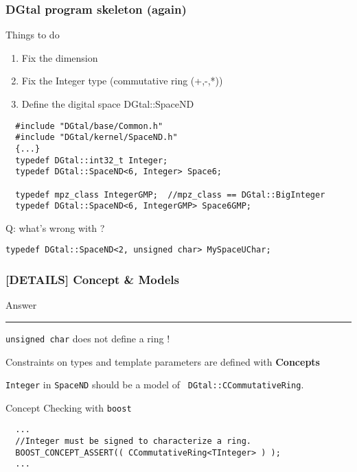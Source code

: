 \documentclass[8pt]{beamer}
\newcommand{\HH}{ \vspace{0.5pt}\hrule}
\begin{document}
\begin{frame}[containsverbatim]
  \frametitle{DGtal program skeleton (again)}

Things to do
  \begin{enumerate}
  \item Fix the dimension
  \item Fix the Integer type (commutative ring (+,-,*))
  \item Define the digital space DGtal::SpaceND
  \end{enumerate}


  
\begin{lstlisting}
  #include "DGtal/base/Common.h"
  #include "DGtal/kernel/SpaceND.h"
  {...}
  typedef DGtal::int32_t Integer;
  typedef DGtal::SpaceND<6, Integer> Space6;
  
  typedef mpz_class IntegerGMP;  //mpz_class == DGtal::BigInteger
  typedef DGtal::SpaceND<6, IntegerGMP> Space6GMP;
\end{lstlisting}

Q: what's wrong with ?
\begin{lstlisting}
typedef DGtal::SpaceND<2, unsigned char> MySpaceUChar;
\end{lstlisting}
\end{frame}


\begin{frame}[containsverbatim]
  \frametitle{[DETAILS] Concept \& Models}
  
  
  \begin{alertblock}{Answer\HH}
    \texttt{unsigned char} does not define a ring !
  \end{alertblock}

\vspace{0.5cm}

\begin{block}{}
  Constraints on types and template parameters are defined with {\bf
    Concepts}
\end{block}

\vspace{0.3cm}

{\tt Integer} in {\tt SpaceND} should be a model of {\tt
  DGtal::CCommutativeRing}.

\vspace{0.5cm}
Concept Checking  with {\tt boost}
\begin{lstlisting}
  ...
  //Integer must be signed to characterize a ring.
  BOOST_CONCEPT_ASSERT(( CCommutativeRing<TInteger> ) );
  ...
\end{lstlisting}
\end{frame}
\end{document}
